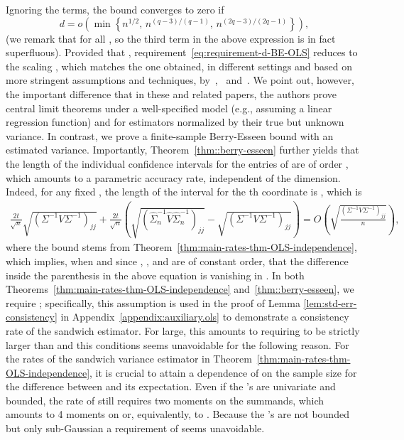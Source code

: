 \documentclass{article}
\begin{document}
Ignoring the   terms, the bound converges to zero if
\begin{equation}\label{eq:requirement-d-BE-OLS}
d = o\left(\min\left\{n^{1/2},\, n^{(q-3)/(q-1)},\, n^{(2q-3)/(2q-1)}\right\}\right),
\end{equation}
(we remark that   for all  , so the third term in the above expression is in fact superfluous). Provided that  , requirement~\eqref{eq:requirement-d-BE-OLS} reduces to the scaling  , which matches the one obtained, in different settings and based on more stringent assumptions and techniques, by~\cite{Portnoy84,Portnoy85,Portnoy86,portnoy1987central,Portnoy88},~\cite{He2000} and~\cite{spokoiny2012parametric}. We point out, however, the important difference that in these and related papers, the authors prove central limit theorems under a well-specified model (e.g., assuming a linear regression function) and for
estimators normalized by their true but unknown variance. In contrast, we prove a finite-sample Berry-Esseen bound with an estimated variance.
Importantly,
Theorem~\ref{thm::berry-esseen} further yields that the length of the individual confidence intervals for the entries of   are of order  , which amounts to a parametric accuracy rate, independent of the dimension. Indeed, for any fixed  , the length of the interval for the  th coordinate is  , which is
\begin{align*}
\frac{2t}{\sqrt{n}} \sqrt{({\Sigma}^{-1}V{\Sigma}^{-1})_{jj}}
+ \frac{2t}{\sqrt{n}} \left( \sqrt{(\widehat{\Sigma}_n^{-1}\widehat{V}\widehat{\Sigma}_n^{-1})_{jj}} - \sqrt{({\Sigma}^{-1}V{\Sigma}^{-1})_{jj}}
\right) = O \left( \sqrt{\frac{({\Sigma}^{-1}V{\Sigma}^{-1})_{jj}}{n}} \right),
\end{align*}
where the bound stems from Theorem~\ref{thm:main-rates-thm-OLS-independence}, which
implies,
when   and since  ,  ,   and   are of constant order, that the difference inside the parenthesis in the above equation is vanishing in  .
In both Theorems~\ref{thm:main-rates-thm-OLS-independence} and~\ref{thm::berry-esseen}, we require  ; specifically, this assumption is used in the proof of Lemma \ref{lem:std-err-consistency} in Appendix~\ref{appendix:auxiliary.ols} to demonstrate a consistency rate of the sandwich estimator. For   large, this amounts to requiring   to be strictly larger than   and this conditions seems unavoidable for the following reason. For the rates of the sandwich variance estimator in Theorem~\ref{thm:main-rates-thm-OLS-independence}, it is crucial to attain a dependence of   on the sample size for the difference between   and its expectation. Even if the  's are univariate and bounded, the rate of   still requires two moments on the summands, which amounts to 4 moments on   or, equivalently, to  . Because the  's are not bounded but only sub-Gaussian a requirement of   seems unavoidable.
\end{document}
